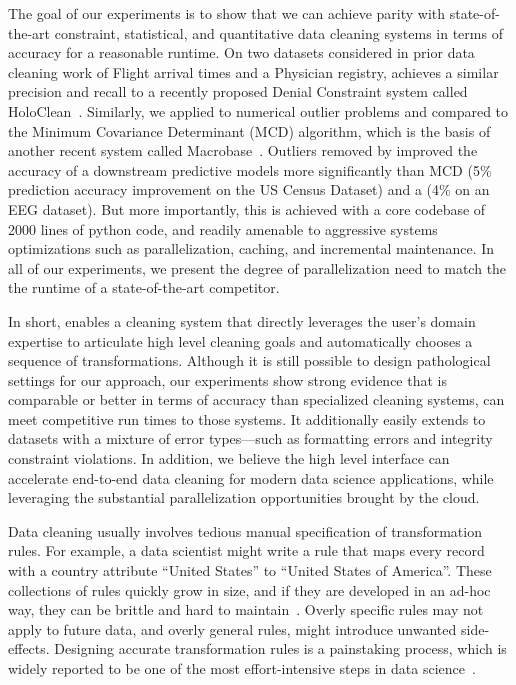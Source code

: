 The goal of our experiments is to show that we can achieve parity with state-of-the-art constraint, statistical, and quantitative data cleaning systems in terms of accuracy for a reasonable runtime.
On two datasets considered in prior data cleaning work of Flight arrival times and a Physician registry, \sys achieves a similar precision and recall to a recently proposed Denial Constraint system called HoloClean~\cite{rekatsinas2017holoclean}. 
Similarly, we applied \sys to numerical outlier problems and compared to the Minimum Covariance Determinant (MCD) algorithm, which is the basis of another recent system called Macrobase~\cite{bailis2016macrobase}.
Outliers removed by \sys  improved the accuracy of a downstream predictive models more significantly than MCD (5\% prediction accuracy improvement on the US Census Dataset) and a (4\% on an EEG dataset). 
But more importantly, this is achieved with a core codebase of 2000 lines of python code, and readily amenable to aggressive systems optimizations such as parallelization, caching, and incremental maintenance.
In all of our experiments, we present the degree of parallelization need to match the the runtime of a state-of-the-art competitor.

In short, \sys enables a cleaning system that directly leverages the user's domain expertise to articulate high level cleaning goals and automatically chooses a sequence of transformations.  Although it is still possible to design pathological settings for our approach, our experiments show strong evidence that \sys is comparable or better in terms of accuracy than specialized cleaning systems, can meet competitive run times to those systems.
It additionally easily extends to datasets with a mixture of error types---such as formatting errors and integrity constraint violations.   In addition, we believe the high level interface can accelerate end-to-end data cleaning for modern data science applications, while leveraging the substantial parallelization opportunities brought by the cloud. 





Data cleaning usually involves tedious manual specification of transformation rules.
For example, a data scientist might write a rule that maps every record with a \textsf{country} attribute ``United States'' to ``United States of America''.
These collections of rules quickly grow in size, and if they are developed in an ad-hoc way, they can be brittle and hard to maintain~\cite{krishnan2016hilda}.
Overly specific rules may not apply to future data, and overly general rules, might introduce unwanted side-effects.
Designing accurate transformation rules is a painstaking process, which is widely reported to be one of the most effort-intensive steps in data science~\cite{nytimes}.

